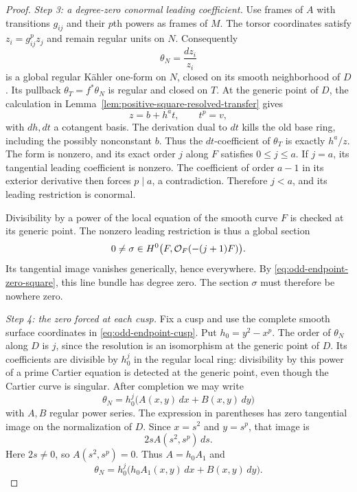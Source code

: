 \begin{proof}
\emph{Step 3: a degree-zero conormal leading coefficient.}
Use frames of $A$ with transitions $g_{ij}$ and their $p$th
powers as frames of $M$.
The torsor coordinates satisfy $z_i=g_{ij}^p z_j$ and remain
regular units on $N$.
Consequently
\[
 \theta_N=\frac{dz_i}{z_i}
\]
is a global regular K\"ahler one-form on $N$, closed on its
smooth neighborhood of $D$.
Its pullback $\theta_T=f^*\theta_N$ is regular and closed on $T$.
At the generic point of $D$, the calculation in
Lemma~\ref{lem:positive-square-resolved-transfer} gives
\[
 z=b+h^a t,\qquad t^p=v,
\]
with $dh,dt$ a cotangent basis.
The derivation dual to $dt$ kills the old base ring, including
the possibly nonconstant $b$.
Thus the $dt$-coefficient of $\theta_T$ is exactly $h^a/z$.
The form is nonzero, and its exact order $j$ along $F$ satisfies
$0\leq j\leq a$.
If $j=a$, its tangential leading coefficient is nonzero.
The coefficient of order $a-1$ in its exterior derivative
then forces $p\mid a$, a contradiction.
Therefore $j<a$, and its leading restriction is conormal.

Divisibility by a power of the local equation of the smooth
curve $F$ is checked at its generic point.
The nonzero leading restriction is thus a global section
\begin{equation}\label{eq:odd-endpoint-leading-section}
 0\ne\sigma\in
 H^0\bigl(F,\mathcal O_F(-(j+1)F)\bigr).
\end{equation}
Its tangential image vanishes generically, hence everywhere.
By \eqref{eq:odd-endpoint-zero-square}, this line bundle has
degree zero.
The section $\sigma$ must therefore be nowhere zero.

\emph{Step 4: the zero forced at each cusp.}
Fix a cusp and use the complete smooth surface coordinates
in \eqref{eq:odd-endpoint-cusp}.
Put $h_0=y^2-x^p$.
The order of $\theta_N$ along $D$ is $j$, since the resolution
is an isomorphism at the generic point of $D$.
Its coefficients are divisible by $h_0^j$ in the regular
local ring: divisibility by this power of a prime Cartier
equation is detected at the generic point, even though
the Cartier curve is singular.
After completion we may write
\[
 \theta_N=h_0^j\bigl(A(x,y)\,dx+B(x,y)\,dy\bigr)
\]
with $A,B$ regular power series.
The expression in parentheses has zero tangential image
on the normalization of $D$.
Since $x=s^2$ and $y=s^p$, that image is
\[
 2sA(s^2,s^p)\,ds.
\]
Here $2s\ne0$, so $A(s^2,s^p)=0$.
Thus $A=h_0A_1$ and
\begin{equation}\label{eq:odd-endpoint-local-form}
 \theta_N
   =h_0^j\bigl(h_0A_1(x,y)\,dx+B(x,y)\,dy\bigr).
\end{equation}


\end{proof}
